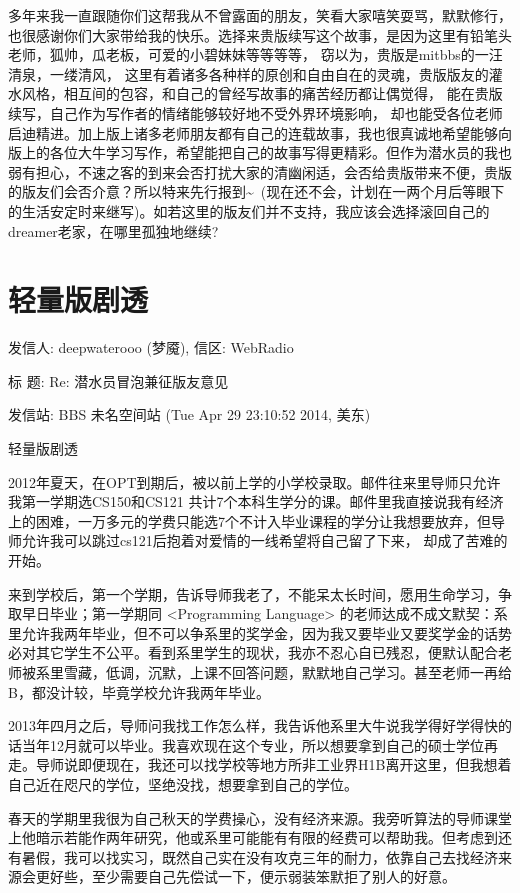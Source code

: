 \documentclass[12pt]{book}
\begin{document}
多年来我一直跟随你们这帮我从不曾露面的朋友，笑看大家嘻笑耍骂，默默修行，也很感谢你们大家带给我的快乐。选择来贵版续写这个故事，是因为这里有铅笔头老师，狐帅，瓜老板，可爱的小碧妹妹等等等等， 窃以为，贵版是mitbbs的一汪清泉，一缕清风， 这里有着诸多各种样的原创和自由自在的灵魂，贵版版友的灌水风格，相互间的包容，和自己的曾经写故事的痛苦经历都让偶觉得， 能在贵版续写，自己作为写作者的情绪能够较好地不受外界环境影响， 却也能受各位老师启迪精进。加上版上诸多老师朋友都有自己的连载故事，我也很真诚地希望能够向版上的各位大牛学习写作，希望能把自己的故事写得更精彩。但作为潜水员的我也弱有担心，不速之客的到来会否打扰大家的清幽闲适，会否给贵版带来不便，贵版的版友们会否介意？所以特来先行报到\textasciitilde{}~(现在还不会，计划在一两个月后等眼下的生活安定时来继写)。如若这里的版友们并不支持，我应该会选择滚回自己的dreamer老家，在哪里孤独地继续?
\section{轻量版剧透}
\label{sec-13-2}
发信人: deepwaterooo (梦魇), 信区: WebRadio

标  题: Re: 潜水员冒泡兼征版友意见

发信站: BBS 未名空间站 (Tue Apr 29 23:10:52 2014, 美东)

轻量版剧透

2012年夏天，在OPT到期后，被以前上学的小学校录取。邮件往来里导师只允许我第一学期选CS150和CS121 共计7个本科生学分的课。邮件里我直接说我有经济上的困难，一万多元的学费只能选7个不计入毕业课程的学分让我想要放弃，但导师允许我可以跳过cs121后抱着对爱情的一线希望将自己留了下来， 却成了苦难的开始。

来到学校后，第一个学期，告诉导师我老了，不能呆太长时间，愿用生命学习，争取早日毕业；第一学期同 <Programming Language> 的老师达成不成文默契：系里允许我两年毕业，但不可以争系里的奖学金，因为我又要毕业又要奖学金的话势必对其它学生不公平。看到系里学生的现状，我亦不忍心自已残忍，便默认配合老师被系里雪藏，低调，沉默，上课不回答问题，默默地自己学习。甚至老师一再给B，都没计较，毕竟学校允许我两年毕业。

2013年四月之后，导师问我找工作怎么样，我告诉他系里大牛说我学得好学得快的话当年12月就可以毕业。我喜欢现在这个专业，所以想要拿到自己的硕士学位再走。导师说即便现在，我还可以找学校等地方所非工业界H1B离开这里，但我想着自己近在咫尺的学位，坚绝没找，想要拿到自己的学位。

春天的学期里我很为自己秋天的学费操心，没有经济来源。我旁听算法的导师课堂上他暗示若能作两年研究，他或系里可能能有有限的经费可以帮助我。但考虑到还有暑假，我可以找实习，既然自己实在没有攻克三年的耐力，依靠自己去找经济来源会更好些，至少需要自己先偿试一下，便示弱装笨默拒了别人的好意。
\end{document}
